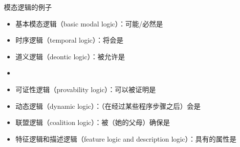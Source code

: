     \begin{frame}{模态逻辑的例子}
    \begin{itemize}
        \item 基本模态逻辑（basic modal logic）：可能/必然是
        \item 时序逻辑（temporal logic）：将会是
        \item 道义逻辑（deontic logic）：被允许是
        \item {}
        \item 可证性逻辑（provability logic）：可以被证明是
        \item 动态逻辑（dynamic logic）：（在经过某些程序步骤之后）会是
        \item 联盟逻辑（coalition logic）：被（她的父母）确保是
        \item 特征逻辑和描述逻辑（feature logic and description logic）：具有的属性是
    \end{itemize}
    \end{frame}
    
